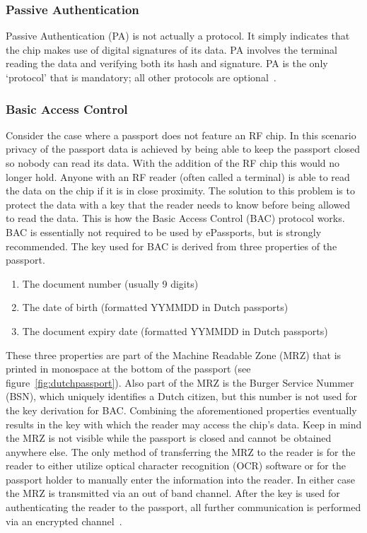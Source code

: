 \subsubsection{Passive Authentication}
Passive Authentication (PA) is not actually a protocol. It simply indicates that the chip makes use of digital signatures of its data. PA involves the terminal reading the data and verifying both its hash and signature. PA is the only `protocol' that is mandatory; all other protocols are optional~\cite{mostowski2010electronic}.

\subsubsection{Basic Access Control}
Consider the case where a passport does not feature an RF chip. In this scenario privacy of the passport data is achieved by being able to keep the passport closed so nobody can read its data. With the addition of the RF chip this would no longer hold. Anyone with an RF reader (often called a terminal) is able to read the data on the chip if it is in close proximity. The solution to this problem is to protect the data with a key that the reader needs to know before being allowed to read the data. This is how the Basic Access Control (BAC) protocol works. BAC is essentially not required to be used by ePassports, but is strongly recommended. The key used for BAC is derived from three properties of the passport.
\begin{enumerate}
	\item The document number (usually 9 digits)
  \item The date of birth (formatted YYMMDD in Dutch passports)
  \item The document expiry date (formatted YYMMDD in Dutch passports)
\end{enumerate}
These three properties are part of the Machine Readable Zone (MRZ) that is printed in monospace at the bottom of the passport (see figure~\ref{fig:dutchpassport}). Also part of the MRZ is the Burger Service Nummer (BSN), which uniquely identifies a Dutch citizen, but this number is not used for the key derivation for BAC. Combining the aforementioned properties eventually results in the key with which the reader may access the chip's data. Keep in mind the MRZ is not visible while the passport is closed and cannot be obtained anywhere else. The only method of transferring the MRZ to the reader is for the reader to either utilize optical character recognition (OCR) software or for the passport holder to manually enter the information into the reader. In either case the MRZ is transmitted via an out of band channel. After the key is used for authenticating the reader to the passport, all further communication is performed via an encrypted channel~\cite{icao}.

